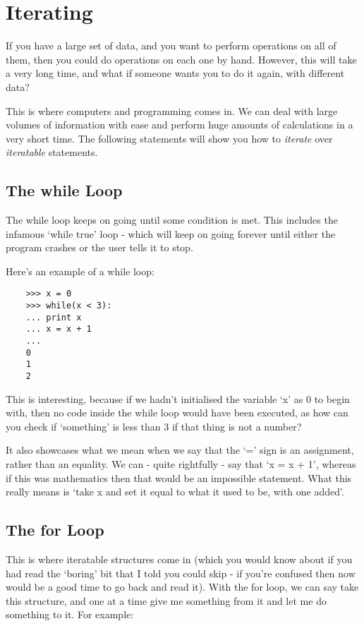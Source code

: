 \section{Iterating}

If you have a large set of data, and you want to perform operations on all of
them, then you could do operations on each one by hand. However, this will take
a very long time, and what if someone wants you to do it again, with different
data?

This is where computers and programming comes in. We can deal with large volumes
of information with ease and perform huge amounts of calculations in a very
short time. The following statements will show you how to \emph{iterate} over
\emph{iteratable} statements.

\subsection{The while Loop}

The while loop keeps on going until some condition is met. This includes the
infamous `while true' loop - which will keep on going forever until either the
program crashes or the user tells it to stop.

Here's an example of a while loop:

\begin{lstlisting}
    >>> x = 0
    >>> while(x < 3):
    ... print x
    ... x = x + 1
    ...
    0
    1
    2
\end{lstlisting}

This is interesting, because if we hadn't initialised the variable `x' as 0 to
begin with, then no code inside the while loop would have been executed, as how
can you check if `something' is less than 3 if that thing is not a number?

It also showcases what we mean when we say that the `=' sign is an assignment,
rather than an equality. We can - quite rightfully - say that `x = x + 1',
whereas if this was mathematics then that would be an impossible statement. What
this really means is `take x and set it equal to what it used to be, with one
added'. 

\subsection{The for Loop}

This is where iteratable structures come in (which you would know about if you
had read the `boring' bit that I told you could skip - if you're confused then
now would be a good time to go back and read it). With the for loop, we can say
take this structure, and one at a time give me something from it and let me
do something to it. For example:

